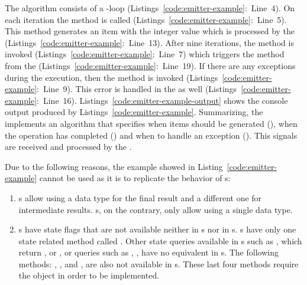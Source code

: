\documentclass[type=bsc,accentcolor=tud9c]{tudthesis}
\begin{document}
The algorithm consists of a -loop (Listings~\ref{code:emitter-example}:~Line~4). On each iteration the method  is called (Listings~\ref{code:emitter-example}:~Line~5). This method generates an item with the integer value  which is processed by the  (Listings~\ref{code:emitter-example}:~Line~13). After nine iterations, the method  is invoked (Listings~\ref{code:emitter-example}:~Line~7) which triggers the  method from the  (Listings~\ref{code:emitter-example}:~Line~19). If there are any exceptions during the execution, then the  method is invoked (Listings~\ref{code:emitter-example}:~Line~9). This error is handled in the  as well (Listings~\ref{code:emitter-example}:~Line~16). Listings~\ref{code:emitter-example-output} shows the console output produced by Listings~\ref{code:emitter-example}. Summarizing, the  implements an algorithm that specifies when items should be generated (), when the operation has completed () and when to handle an exception (). This signals are received and processed by the .

Due to the following reasons, the example showed in Listing~\ref{code:emitter-example} cannot be used as it is to replicate the behavior of s: 
\begin{enumerate}
	\item {}s allow using a data type for the final result and a different one for intermediate results. s, on the contrary, only allow using a single data type.
	\item {}s have state flags that are not available neither in s nor in s. s have only one state related method called . Other state queries available in s such as , which return ,  or , or queries such as , ,  have no equivalent in s. The following methods: , ,  and , are also not available in s. These last four methods require the object  in order to be implemented.
\end{enumerate}
\end{document}
